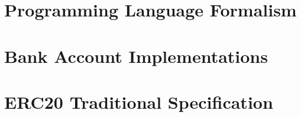 \documentclass[acmsmall]{acmart}
\begin{document}


\newpage
\appendix

\section{Programming Language Formalism}
\label{app:LangOO}


\clearpage

%


\section{Bank Account Implementations}
\label{Bank:appendix}


\clearpage

\section{ERC20 Traditional Specification}
\label{sect:ERC20:appendix}

\clearpage

%

%   
%  
\end{document}
